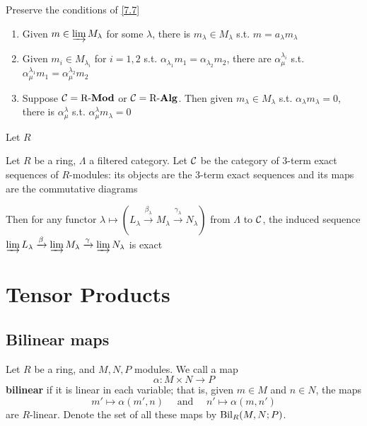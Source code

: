 \documentclass[11pt]{article}
\begin{document}
\begin{corollary}[]
Preserve the conditions of \ref{7.7}
\begin{enumerate}
\item Given \(m\in\varinjlim M_\lambda\) for some \(\lambda\), there is \(m_\lambda\in
      M_\lambda\) s.t. \(m=a_\lambda m_\lambda\)
\item Given \(m_i\in M_{\lambda_i}\) for \(i=1,2\) s.t.
\(\alpha_{\lambda_1}m_1=\alpha_{\lambda_2}m_2\), there are
\(\alpha_\mu^{\lambda_i}\) s.t. \(\alpha_\mu^{\lambda_1}m_1=\alpha_\mu^{\lambda_2}m_2\)
\item Suppose \(\mathcal{C}=\operatorname{R-\textbf{Mod}}\) or \(\mathcal{C}=\operatorname{R-\textbf{Alg}}\). Then given \(m_\lambda\in
      M_\lambda\) s.t. \(\alpha_\lambda m_\lambda=0\), there is
\(\alpha_\mu^\lambda\) s.t. \(\alpha_\mu^\lambda m_\lambda=0\)
\end{enumerate}
\end{corollary}

\begin{exercise}
Let \(R\)
\end{exercise}

\begin{theorem}
Let \(R\) be a ring, \(\Lambda\) a filtered category. Let \(\mathcal{C}\) be the category of
3-term exact sequences of \(R\)-modules: its objects are the 3-term exact
sequences and its maps are the commutative diagrams
\begin{center}
\end{center}
Then for any functor \(\lambda\mapsto(L_\lambda
   \xrightarrow{\beta_\lambda}M_\lambda\xrightarrow{\gamma_\lambda}
   N_\lambda)\) from \(\Lambda\) to \(\mathcal{C}\), the induced sequence
\(\varinjlim L_\lambda\xrightarrow{\beta}\varinjlim
   M_\lambda\xrightarrow{\gamma}\varinjlim N_\lambda\) is exact
\end{theorem}

\section{Tensor Products}
\label{sec:org0138676}
\subsection*{Bilinear maps}
\label{sec:orgef6745c}
Let \(R\) be a ring, and \(M,N,P\) modules. We call a map
\begin{equation*}
\alpha:M\times N\to P
\end{equation*}
\textbf{bilinear} if it is linear in each variable; that is, given \(m\in M\) and
\(n\in N\), the maps
\begin{equation*}
m'\mapsto\alpha(m',n)\quad\text{ and }\quad
n'\mapsto \alpha(m,n')
\end{equation*}
are \(R\)-linear. Denote the set of all these maps by \(\operatorname{Bil}_R(M,N;P)\).
\end{document}
